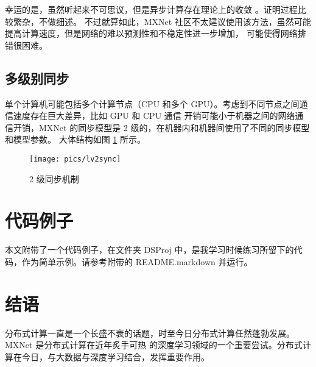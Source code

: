 \documentclass{ctexart}
\begin{document}
幸运的是，虽然听起来不可思议，但是异步计算存在理论上的收敛 \cite{scaling}。证明过程比较繁杂，不做细述。
不过就算如此，MXNet 社区不太建议使用该方法，虽然可能提高计算速度，但是网络的难以预测性和不稳定性进一步增加，
可能使得网络排错很困难。

\subsection{多级别同步}

单个计算机可能包括多个计算节点（CPU 和多个 GPU）。考虑到不同节点之间通信速度存在巨大差异，比如 GPU 和 CPU 通信
开销可能小于机器之间的网络通信开销，MXNet 的同步模型是 2 级的，在机器内和机器间使用了不同的同步模型和模型参数。
大体结构如图 \ref{fig:lv2sync} 所示。

\begin{figure}
\centering
\texttt{[image: pics/lv2sync]}
\caption{2 级同步机制}
\label{fig:lv2sync}
\end{figure}

\section{代码例子}

本文附带了一个代码例子，在文件夹 DSProj 中，是我学习时候练习所留下的代码，作为简单示例。请参考附带的
README.markdown 并运行。

\section{结语}

分布式计算一直是一个长盛不衰的话题，时至今日分布式计算任然蓬勃发展。MXNet 是分布式计算在近年炙手可热
的深度学习领域的一个重要尝试。分布式计算在今日，与大数据与深度学习结合，发挥重要作用。

\pagebreak

\end{document}
